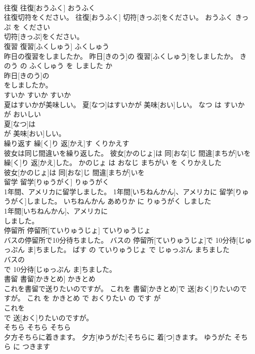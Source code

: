 \documentclass[8pt]{extreport}
\begin{document}
\begin{CJK}{UTF8}{min}
\\	往復	往復[おうふく]	おうふく	
\\	往復切符をください。	往復[おうふく] 切符[きっぷ]をください。	おうふく きっぷ を ください	
\\	切符[きっぷ]をください。			
\\	復習	復習[ふくしゅう]	ふくしゅう	
\\	昨日の復習をしましたか。	昨日[きのう]の 復習[ふくしゅう]をしましたか。	きのう の ふくしゅう を しました か	
\\	昨日[きのう]の
\\	をしましたか。			
\\	すいか	すいか	すいか	
\\	夏はすいかが美味しい。	夏[なつ]はすいかが 美味[おい]しい。	なつ は すいか が おいしい	
\\	夏[なつ]は
\\	が 美味[おい]しい。			
\\	繰り返す	繰[く]り 返[かえ]す	くりかえす	
\\	彼女は同じ間違いを繰り返した。	彼女[かのじょ]は 同[おな]じ 間違[まちが]いを 繰[く]り 返[かえ]した。	かのじょ は おなじ まちがい を くりかえした	
\\	彼女[かのじょ]は 同[おな]じ 間違[まちが]いを
\\	留学	留学[りゅうがく]	りゅうがく	
\\	1年間、アメリカに留学しました。	1年間[いちねんかん]、アメリカに 留学[りゅうがく]しました。	いちねんかん あめりか に りゅうがく しました	
\\	1年間[いちねんかん]、アメリカに
\\	しました。			
\\	停留所	停留所[ていりゅうじょ]	ていりゅうじょ	
\\	バスの停留所で10分待ちました。	バスの 停留所[ていりゅうじょ]で 10分待[じゅっぷん ま]ちました。	ばす の ていりゅうじょ で じゅっぷん まちました	
\\	バスの
\\	で 10分待[じゅっぷん ま]ちました。			
\\	書留	書留[かきとめ]	かきとめ	
\\	これを書留で送りたいのですが。	これを 書留[かきとめ]で 送[おく]りたいのですが。	これ を かきとめ で おくりたい の です が	
\\	これを
\\	で 送[おく]りたいのですが。			
\\	そちら	そちら	そちら	
\\	夕方そちらに着きます。	夕方[ゆうがた]そちらに 着[つ]きます。	ゆうがた そちら に つきます	

\end{CJK}
\end{document}
